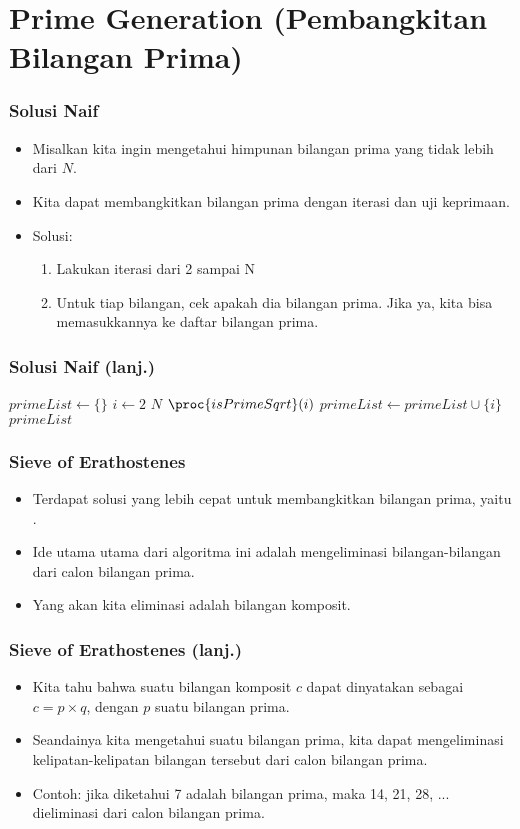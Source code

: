 \section{Prime Generation \newline (Pembangkitan Bilangan Prima)}
\frame{\sectionpage}

\begin{frame}
\frametitle{Solusi Naif}
\begin{itemize}
  \item Misalkan kita ingin mengetahui himpunan bilangan prima yang tidak lebih dari $N$.
  \item Kita dapat membangkitkan bilangan prima dengan iterasi dan uji keprimaan.
  \item Solusi: 
  \begin{enumerate}
    \item Lakukan iterasi dari 2 sampai N
    \item Untuk tiap bilangan, cek apakah dia bilangan prima. Jika ya, kita bisa memasukkannya ke daftar bilangan prima.
  \end{enumerate}
\end{itemize}
\end{frame}

\begin{frame}
\frametitle{Solusi Naif (lanj.)}
\begin{codebox}
\li $primeList \gets \{\}$
\li \For $i \gets 2$ \To $N$
    \Do
\li   \If $\proc{isPrimeSqrt}(i)$
      \Then
\li     $primeList \gets primeList \cup \{i\}$
      \End    
    \End
\li \Return $primeList$
\end{codebox}
\end{frame}

\begin{frame}
\frametitle{Sieve of Erathostenes}
\begin{itemize}
  \item Terdapat solusi yang lebih cepat untuk membangkitkan bilangan prima, yaitu .
  \item Ide utama utama dari algoritma ini adalah mengeliminasi bilangan-bilangan dari calon bilangan prima.
  \item Yang akan kita eliminasi adalah bilangan komposit.
\end{itemize}
\end{frame}

\begin{frame}
\frametitle{Sieve of Erathostenes (lanj.)}
\begin{itemize}
  \item Kita tahu bahwa suatu bilangan komposit $c$ dapat dinyatakan sebagai $c = p \times q$, dengan $p$ suatu bilangan prima.
  \item Seandainya kita mengetahui suatu bilangan prima, kita dapat mengeliminasi kelipatan-kelipatan bilangan tersebut dari calon bilangan prima.
  \item Contoh: jika diketahui 7 adalah bilangan prima, maka 14, 21, 28, ... dieliminasi dari calon bilangan prima.
\end{itemize}
\end{frame}


